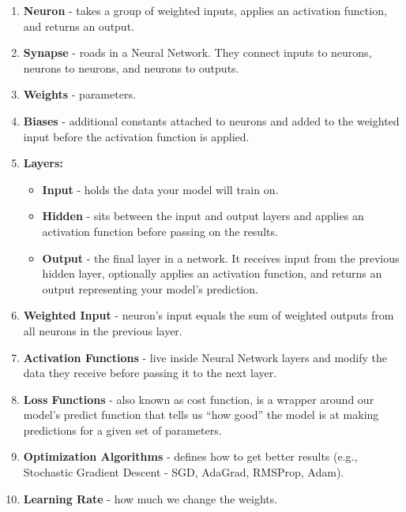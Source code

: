 \documentclass[12pt]{article}
\begin{document}
\begin{enumerate}[1.]
	\item \textbf{Neuron} - takes a group of weighted inputs, applies an activation function, and returns an output.
	\item \textbf{Synapse} - roads in a Neural Network. They connect inputs to neurons, neurons to neurons, and neurons to outputs.
	\item \textbf{Weights} - parameters.
 	\item \textbf{Biases} - additional constants attached to neurons and added to the weighted input before the activation function is applied.
	\item \textbf{Layers: } 
		\begin{itemize}
			\item\textbf{Input} - holds the data your model will train on.  
 			\item\textbf{Hidden} - sits between the input and output layers and applies an activation function before passing on the results.
			\item\textbf{Output} - the final layer in a network. It receives input from the previous hidden layer, optionally applies an activation function, and returns an output representing your model’s prediction.
		\end{itemize}   
	\item \textbf{Weighted Input} - neuron’s input equals the sum of weighted outputs from all neurons in the previous layer.
	\item \textbf{Activation Functions} - live inside Neural Network layers and modify the data they receive before passing it to the next layer.
	\item \textbf{Loss Functions} - also known as cost function, is a wrapper around our model’s predict function that tells us “how good” the model is at making predictions for a given set of parameters.
	\item \textbf{Optimization Algorithms} - defines how to get better results (e.g., Stochastic Gradient Descent - SGD, AdaGrad, RMSProp, Adam).
	\item \textbf{Learning Rate} - how much we change the weights.
\end{enumerate}

\end{document}
